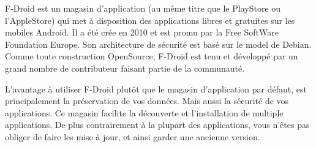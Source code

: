 F-Droid est un magasin d'application (au même titre que le PlayStore ou l'AppleStore) qui met à disposition des applications libres et gratuites sur les mobiles Android.
Il a été crée en 2010 et est promu par la Free SoftWare Foundation Europe. Son architecture de sécurité est basé sur le model de Debian.
Comme toute construction OpenSource, F-Droid est tenu et développé par un grand nombre de contributeur faisant partie de la communauté. 

L’avantage à utiliser F-Droid plutôt que le magasin d'application par défaut, est principalement la préservation de vos données. Mais aussi la sécurité de vos applications. 
Ce magasin facilite la découverte et l'installation de multiple applications. De plus contrairement à la plupart des applications, vous n’êtes pas obliger de faire les mise à jour, et ainsi garder une ancienne version. 